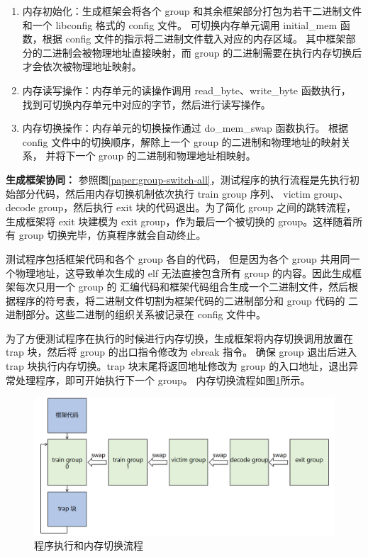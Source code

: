 \begin{enumerate}
    \item 内存初始化：生成框架会将各个 group 和其余框架部分打包为若干二进制文件和一个 libconfig 格式的 config 文件。
可切换内存单元调用 initial\_mem 函数，根据 config 文件的指示将二进制文件载入对应的内存区域。
其中框架部分的二进制会被物理地址直接映射，而 group 的二进制需要在执行内存切换后才会依次被物理地址映射。\par
    \item 内存读写操作：内存单元的读操作调用 read\_byte、write\_byte 函数执行，
找到可切换内存单元中对应的字节，然后进行读写操作。\par
    \item 内存切换操作：内存单元的切换操作通过 do\_mem\_swap 函数执行。
根据 config 文件中的切换顺序，解除上一个 group 的二进制和物理地址的映射关系，
并将下一个 group 的二进制和物理地址相映射。\par
\end{enumerate}

\textbf{生成框架协同：}
参照图\ref{paper:group-switch-all}，测试程序的执行流程是先执行初始部分代码，然后用内存切换机制依次执行 train group 序列、
victim group、decode group，然后执行 exit 块的代码退出。为了简化 group 之间的跳转流程，生成框架将 exit 块建模为
 exit group，作为最后一个被切换的 group。这样随着所有 group 切换完毕，仿真程序就会自动终止。\par

测试程序包括框架代码和各个 group 各自的代码，
但是因为各个 group 共用同一个物理地址，这导致单次生成的 elf 无法直接包含所有 group 的内容。因此生成框架每次只用一个 group 的
汇编代码和框架代码组合生成一个二进制文件，然后根据程序的符号表，将二进制文件切割为框架代码的二进制部分和 group 代码的
二进制部分。这些二进制的组织关系被记录在 config 文件中。\par

为了方便测试程序在执行的时候进行内存切换，生成框架将内存切换调用放置在 trap 块，然后将 group 的出口指令修改为 ebreak 指令。
确保 group 退出后进入 trap 块执行内存切换。trap 块末尾将返回地址修改为 group 的入口地址，退出异常处理程序，即可开始执行下一个 group。
内存切换流程如图\ref{paper:execute-flow}所示。\par

\begin{figure}[!h]
    \centering
    \includegraphics[width=\linewidth]{figure/paper/execute-flow.png}
    \caption{程序执行和内存切换流程}
    \label{paper:execute-flow}
\end{figure}

